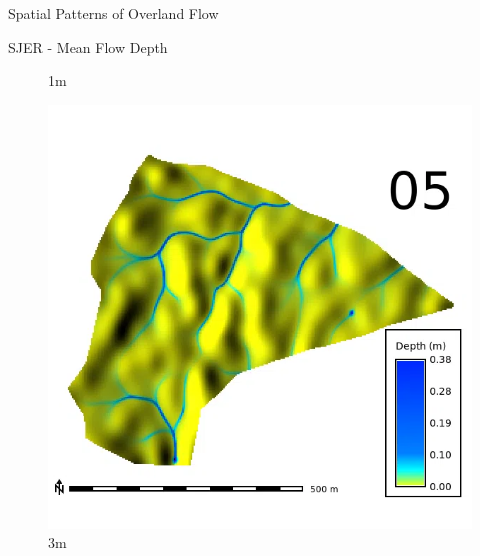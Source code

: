 \documentclass[
  ignorenonframetext,
]{beamer}
\begin{document}
\begin{frame}{Spatial Patterns of Overland Flow}
\begin{block}{SJER - Mean Flow Depth}
\begin{figure}[H]
{}

\caption{1m}

\end{figure}%

\begin{figure}[H]

{\centering \includegraphics{../output/SJER/sensitivity_1/SJER_depth_3_4_s_average.webp}

}

\caption{3m}

\end{figure}%

\begin{figure}[H]


\end{figure}
\end{block}
\end{frame}
\end{document}
